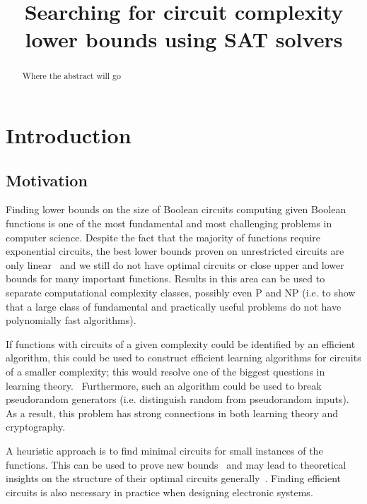 \documentclass{article}
\begin{document}
\begin{titlepage}
\title{Searching for circuit complexity lower bounds using SAT solvers}
\maketitle
\end{titlepage}

\begin{abstract}
Where the abstract will go
\end{abstract}

\tableofcontents

\section{Introduction}

\subsection{Motivation}

Finding lower bounds on the size of Boolean circuits computing given Boolean functions is one of the most fundamental and most challenging problems in computer science. Despite the fact that the majority of functions require exponential circuits, the best lower bounds proven on unrestricted circuits are only linear~\cite{boppana} and we still do not have optimal circuits or close upper and lower bounds for many important functions. Results in this area can be used to separate computational complexity classes, possibly even P and NP (i.e. to show that a large class of fundamental and practically useful problems do not have polynomially fast algorithms).~\cite{arora} 

If functions with circuits of a given complexity could be identified by an efficient algorithm, this could be used to construct efficient learning algorithms for circuits of a smaller complexity; this would resolve one of the biggest questions in learning theory.~\cite{carmosino} Furthermore, such an algorithm could be used to break pseudorandom generators (i.e. distinguish random from pseudorandom inputs).~\cite{arora} As a result, this problem has strong connections in both learning theory and cryptography.

A heuristic approach is to find minimal circuits for small instances of the functions. This can be used to prove new bounds~\cite{kulikovsurvey} and may lead to theoretical insights on the structure of their optimal circuits generally~\cite{williams}. Finding efficient circuits is also necessary in practice when designing electronic systems. 
\end{document}
